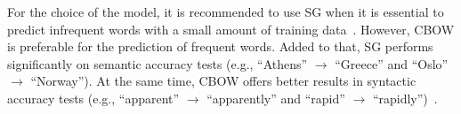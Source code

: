 For the choice of the model, it is recommended to use SG when it is essential to
predict infrequent words with a small amount of training
data~\citep{inproceedings:mikolov}. However, CBOW is preferable for the
prediction of frequent words. Added to that, SG performs significantly on
semantic accuracy tests (e.g., ``Athens'' $\rightarrow$ ``Greece'' and ``Oslo''
$\rightarrow$ ``Norway''). At the same time, CBOW offers better results in
syntactic accuracy tests (e.g., ``apparent'' $\rightarrow$ ``apparently'' and
``rapid'' $\rightarrow$ ``rapidly'')~\citep{sijun_he}.

